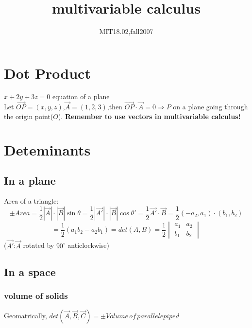 \documentclass{article}
\title{multivariable calculus}
\author{MIT18.02,fall2007}
\date{}
\begin{document}
\maketitle
\section{Dot Product}
$x+2y+3z=0$ equation of a plane\\
Let $\overrightarrow{OP}=(x,y,z)$,$\overrightarrow{A}=(1,2,3)$,then $\overrightarrow{OP}\cdot\overrightarrow{A}=0\Rightarrow P$
on a plane going through the origin point($O$).
\textbf{Remember to use vectors in multivariable calculus!}
\section{Deteminants}
\subsection{In a plane}
Area of a triangle:
\[\pm Area=\frac{1}{2}\left|\overrightarrow{A}\right|
\cdot\left|\overrightarrow{B}\right|\sin\theta
=\frac{1}{2}\left|\overrightarrow{A'}\right|\cdot\left|\overrightarrow{B}\right|\cos\theta'
=\frac{1}{2}\overrightarrow{A'}\cdot\overrightarrow{B}
=\frac{1}{2}(-a_2,a_1)\cdot(b_1,b_2)
\]
\[=\frac{1}{2}(a_1b_2-a_2b_1)
=det(A,B)
=\frac{1}{2}
\begin{vmatrix}
a_1&a_2\\
b_1&b_2
\end{vmatrix}
\]
($\overrightarrow{A'}$:$\overrightarrow{A}$ rotated by $90^\circ$ anticlockwise)
\subsection{In a space}
\subsubsection{volume of solids}
Geomatrically,
$det(\overrightarrow{A},\overrightarrow{B},\overrightarrow{C})
=\pm Volume\, of\, parallelepiped$
\end{document}
